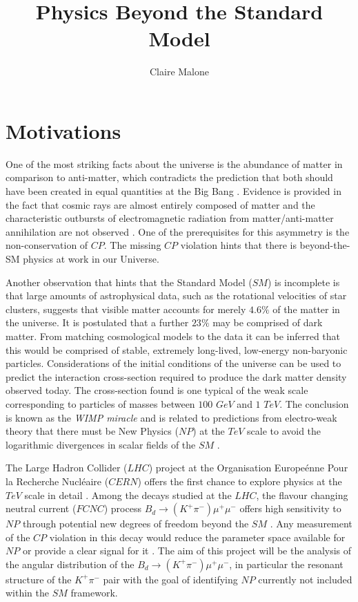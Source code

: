 \documentclass[a4paper,12pt]{article}
\begin{document}
\author{Claire Malone}
\title{Physics Beyond the Standard Model }
\maketitle
\tableofcontents

\section{Motivations}
One of the most striking facts about the universe is the abundance of matter in comparison to anti-matter, which contradicts the prediction that both should have been created in equal quantities at the Big Bang \cite{paper35,paper36}. Evidence is provided  in the fact that cosmic rays are almost entirely composed of matter and the characteristic outbursts of electromagnetic radiation from matter/anti-matter annihilation are not observed \cite[p. 323]{paper35}. One of the prerequisites for this asymmetry is the non-conservation of $CP$. The missing $CP$ violation
hints that there is beyond-the-SM physics at work in our Universe\cite[p. 12]{paper1}.

Another observation that hints that the Standard Model ($SM$) is incomplete is that large amounts of astrophysical data, such as the rotational velocities of star clusters, suggests that visible matter accounts for merely $4.6\%$ of the matter in the universe. It is postulated that a further $23\%$ may be comprised of dark matter. From matching cosmological models to the data it can be inferred that this would be comprised of stable, extremely long-lived, low-energy non-baryonic particles. Considerations of the initial conditions of the universe can be used to predict the interaction cross-section required to produce the dark matter density observed today. The cross-section found is one typical of the weak scale corresponding to particles of masses between $100$ $ GeV$ and $1$ $ TeV$. The conclusion is known as the {\it WIMP miracle} and is related to predictions from electro-weak theory that there must be New Physics ($NP$) at the $TeV$ scale to avoid the logarithmic divergences in scalar fields of the $SM$ \cite[p. 12]{paper1}. 

The Large Hadron Collider ($LHC$) project \cite{paper10} at the Organisation Europe\'enne Pour la Recherche Nucl\'eaire ($CERN$) offers the first chance to explore physics at the $TeV$ scale in detail  \cite[p. 12]{paper1}. Among the decays studied at the $LHC$, the flavour changing neutral current ($FCNC$) process $B_d\rightarrow (K^+\pi^{-})\mu^+\mu^-$ offers high sensitivity to $NP$ through potential new degrees of freedom beyond the $SM$ \cite{paper39}. Any measurement of the $CP$ violation in this decay would reduce the parameter space available for $NP$ or provide a clear signal for it \cite[p. 74]{paper1}. The aim of this project will be the analysis of the angular distribution of the $B_d\rightarrow (K^+\pi^{-})\mu^+\mu^-$, in particular the resonant structure of the $K^+\pi^-$ pair with the goal of identifying $NP$ currently not included within the $SM$ framework.  
\end{document}

